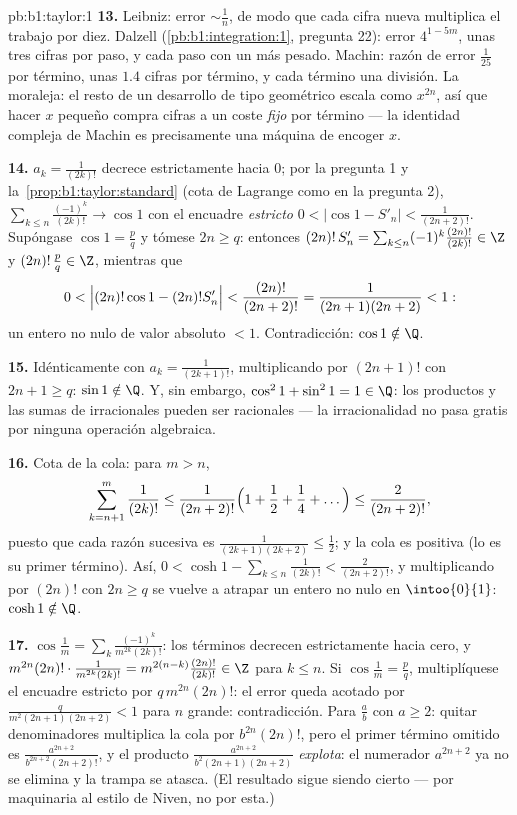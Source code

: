 \begin{solution}{pb:b1:taylor:1}
\textbf{13.} Leibniz: error $\sim \frac1n$, de modo que cada cifra
nueva multiplica el trabajo por diez. Dalzell
(\cref{pb:b1:integration:1}, pregunta 22): error $4^{1-5m}$, unas
tres cifras por paso, y cada paso con un  más pesado.
Machin: razón de error $\frac{1}{25}$ por término, unas $1.4$ cifras
por término, y cada término una división. La moraleja: el resto de
un desarrollo de tipo geométrico escala como $x^{2n}$, así que hacer
$x$ pequeño compra cifras a un coste \emph{fijo} por término --- la
identidad compleja de Machin es precisamente una máquina de encoger
$x$.

\textbf{14.} $a_k = \frac{1}{(2k)!}$ decrece estrictamente hacia
$0$; por la pregunta 1 y la~\cref{prop:b1:taylor:standard} (cota de
Lagrange como en la pregunta 2),
$\sum_{k \leq n}\frac{(-1)^k}{(2k)!} \to \cos 1$ con el encuadre
\emph{estricto} $0 < \bigl|\cos 1 - S'_n\bigr| < \frac{1}{(2n+2)!}$.
Supóngase $\cos 1 = \frac pq$ y tómese $2n \geq q$: entonces
$(2n)!\,S'_n = \sum_{k\leq n} (-1)^k \frac{(2n)!}{(2k)!} \in \Z$ y
$(2n)!\,\frac pq \in \Z$, mientras que
\[
0 < \Bigl|(2n)!\cos 1 - (2n)!S'_n\Bigr| <
\frac{(2n)!}{(2n+2)!} = \frac{1}{(2n+1)(2n+2)} < 1 :
\]
un entero no nulo de valor absoluto $< 1$. Contradicción:
$\cos 1 \notin \Q$.

\textbf{15.} Idénticamente con $a_k = \frac{1}{(2k+1)!}$,
multiplicando por $(2n+1)!$ con $2n + 1 \geq q$:
$\sin 1 \notin \Q$. Y, sin embargo, $\cos^2 1 + \sin^2 1 = 1 \in \Q$:
los productos y las sumas de irracionales pueden ser racionales ---
la irracionalidad no pasa gratis por ninguna operación algebraica.

\textbf{16.} Cota de la cola: para $m > n$,
\[
\sum_{k=n+1}^{m} \frac{1}{(2k)!}
\leq \frac{1}{(2n+2)!}\Bigl(1 + \frac12 + \frac14 +
\dots\Bigr) \leq \frac{2}{(2n+2)!} ,
\]
puesto que cada razón sucesiva es
$\frac{1}{(2k+1)(2k+2)} \leq \frac12$; y la cola es positiva (lo es
su primer término). Así,
$0 < \cosh 1 - \sum_{k\leq n}\frac{1}{(2k)!} < \frac{2}{(2n+2)!}$,
y multiplicando por $(2n)!$ con $2n \geq q$ se vuelve a atrapar un
entero no nulo en $\intoo{0}{1}$: $\cosh 1 \notin \Q$.

\textbf{17.} $\cos\frac1m = \sum_k \frac{(-1)^k}{m^{2k}(2k)!}$: los
términos decrecen estrictamente hacia cero, y
$m^{2n}(2n)!\cdot\frac{1}{m^{2k}(2k)!} =
m^{2(n-k)}\frac{(2n)!}{(2k)!} \in \Z$ para $k \leq n$. Si
$\cos\frac1m = \frac pq$, multiplíquese el encuadre estricto por
$q\,m^{2n}(2n)!$: el error queda acotado por
$\frac{q}{m^2(2n+1)(2n+2)} < 1$ para $n$ grande: contradicción. Para
$\frac ab$ con $a \geq 2$: quitar denominadores multiplica la cola
por $b^{2n}(2n)!$, pero el primer término omitido es
$\frac{a^{2n+2}}{b^{2n+2}(2n+2)!}$, y el producto
$\frac{a^{2n+2}}{b^2(2n+1)(2n+2)}$ \emph{explota}: el numerador
$a^{2n+2}$ ya no se elimina y la trampa se atasca. (El resultado
sigue siendo cierto --- por maquinaria al estilo de Niven, no por
esta.)


\end{solution}
